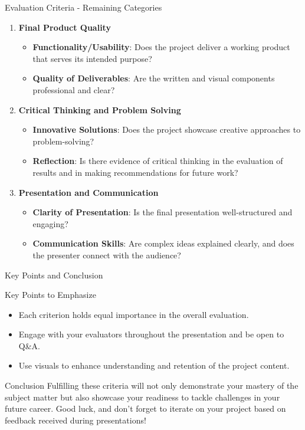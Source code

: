 \documentclass[aspectratio=169]{beamer}
\begin{document}
\begin{frame}[fragile]{Evaluation Criteria - Remaining Categories}
  \begin{enumerate}[resume]
    \item \textbf{Final Product Quality}
      \begin{itemize}
        \item \textbf{Functionality/Usability}: Does the project deliver a working product that serves its intended purpose?
        \item \textbf{Quality of Deliverables}: Are the written and visual components professional and clear?
      \end{itemize}
    \item \textbf{Critical Thinking and Problem Solving}
      \begin{itemize}
        \item \textbf{Innovative Solutions}: Does the project showcase creative approaches to problem-solving?
        \item \textbf{Reflection}: Is there evidence of critical thinking in the evaluation of results and in making recommendations for future work?
      \end{itemize}
    \item \textbf{Presentation and Communication}
      \begin{itemize}
        \item \textbf{Clarity of Presentation}: Is the final presentation well-structured and engaging?
        \item \textbf{Communication Skills}: Are complex ideas explained clearly, and does the presenter connect with the audience?
      \end{itemize}
  \end{enumerate}
\end{frame}

\begin{frame}[fragile]{Key Points and Conclusion}
  \begin{block}{Key Points to Emphasize}
    \begin{itemize}
      \item Each criterion holds equal importance in the overall evaluation.
      \item Engage with your evaluators throughout the presentation and be open to Q\&A.
      \item Use visuals to enhance understanding and retention of the project content.
    \end{itemize}
  \end{block}
  \begin{block}{Conclusion}
    Fulfilling these criteria will not only demonstrate your mastery of the subject matter but also showcase your readiness to tackle challenges in your future career. Good luck, and don’t forget to iterate on your project based on feedback received during presentations!
  \end{block}
\end{frame}
\end{document}
